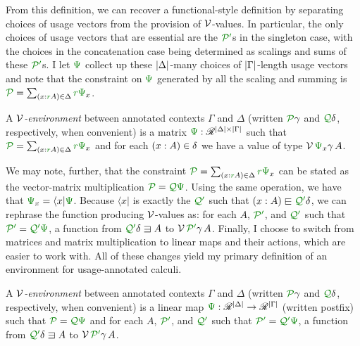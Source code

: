 From this definition, we can recover a functional-style definition by
separating choices of usage vectors from the provision of $\mathcal V$-values.
In particular, the only choices of usage vectors that are essential are the
$\grPprime$s in the singleton case, with the choices in the concatenation case
being determined as scalings and sums of these $\grPprime$s.
I let $\gr\Psi$ collect up these $\left\lvert{\Delta}\right\rvert$-many choices of
$\left\lvert{\Gamma}\right\rvert$-length usage vectors and note that the constraint on $\gr\Psi$
generated by all the scaling and summing is
$\grP = \sum_{\plr{x : \gr rA} \in \Delta} \gr r\gr\Psi_x$.

\begin{definition}
  A \emph{$\mathcal V$-environment} between annotated contexts $\Gamma$ and $\Delta$
  (written $\grP\gamma$ and $\grQ\delta$, respectively, when convenient)
  is a matrix $\gr\Psi : \Ann^{\size\Delta \times \size\Gamma}$ such that
  $\grP = \sum_{\plr{x : \gr rA} \in \Delta} \gr r\gr\Psi_x$ and for each
  $\left(x : A\right) \in \delta$ we have a value of type $\V\,\gr\Psi_x\gamma\,A$.
\end{definition}

We may note, further, that the constraint
$\grP = \sum_{\plr{x : \gr rA} \in \Delta} \gr r\gr\Psi_x$ can be stated as the
vector-matrix multiplication $\grP = \grQ\gr\Psi$.
Using the same operation, we have that $\gr\Psi_x = \langle x \rvert\gr\Psi$.
Because $\langle x \rvert$ is exactly the $\grQprime$ such that
$\plr{x : A} \sqin \grQprime\delta$, we can rephrase the function producing
$\mathcal V$-values as: for each $A$, $\grPprime$, and $\grQprime$ such that
$\grPprime = \grQprime\gr\Psi$, a function from $\grQprime\delta \sqni A$ to
$\V\,\grPprime\gamma\,A$.
Finally, I choose to switch from matrices and matrix multiplication to
linear maps and their actions, which are easier to work with.
All of these changes yield my primary definition of an environment for
usage-annotated calculi.

\begin{definition}
  A \emph{$\mathcal V$-environment} between annotated contexts $\Gamma$ and $\Delta$
  (written $\grP\gamma$ and $\grQ\delta$, respectively, when convenient)
  is a linear map $\gr\Psi : \Ann^{\size\Delta} \to \Ann^{\size\Gamma}$ (written
  postfix) such that $\grP = \grQ\gr\Psi$ and for each $A$, $\grPprime$, and
  $\grQprime$ such that $\grPprime = \grQprime\gr\Psi$, a function from
  $\grQprime\delta \sqni A$ to $\V\,\grPprime\gamma\,A$.
\end{definition}

